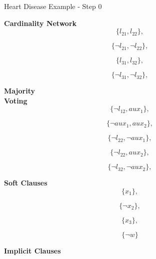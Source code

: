 \begin{frame}{Heart Disease Example - Step 0}
\begin{minipage}[t]{0.19\textwidth}
\begin{block}{\centering \fontsize{8.5pt}{2pt}\selectfont \textbf{Cardinality Network}}
            \[\{l_{21} , l_{22}\},\]
            
            \[\{\lnot l_{21} , \lnot l_{22}\},\]
            
            \[\{l_{31} , l_{32}\},\]
            
            \[\{\lnot l_{31} , \lnot l_{32}\},\]
            \vspace{2pt}
        \end{block}
    \end{minipage}
    \hspace{0.05\textwidth}
    \begin{minipage}[t]{0.18\textwidth}
        \begin{block}{\centering \fontsize{8.5pt}{2pt}\selectfont \textbf{Majority \\ Voting}}
            \linespread{0.1}
            \[\{\lnot l_{12} , aux_{1}\},\]
            \linespread{0.3}
            
            \[\{\lnot aux_{1}, aux_{2}\},\]
            
            \[\{\lnot l_{22} , \lnot aux_{1}\},\]
            
            \[\{\lnot l_{22} , aux_{2}\},\]
            
            \[\{\lnot l_{32} , \lnot aux_{2}\},\]
            \vspace{2pt}
        \end{block}
    \end{minipage}
    \hspace{0.05\textwidth}
    \begin{minipage}[t]{0.12\textwidth}
        \begin{block}{\centering \fontsize{8.5pt}{2pt}\selectfont \textbf{Soft Clauses}}
            \linespread{0.3}
            \[\{x_{1}\},\]
            
            \[\{\lnot x_{2}\},\]
            
            \[\{x_{3}\},\]
            
            \[\{\lnot w\}\]
        \end{block}
        \vspace{10pt}
        \begin{block}{\centering \fontsize{8.5pt}{1pt}\selectfont \textbf{Implicit Clauses}}
            \vspace{5pt}
        \end{block}
    \end{minipage}
\end{frame}


